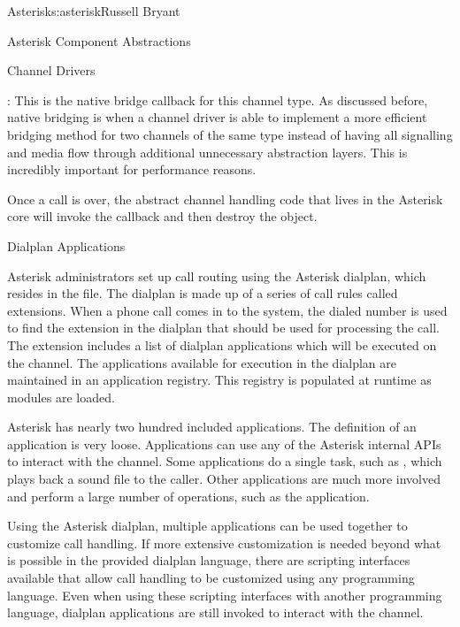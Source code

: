 \begin{aosachapter}{Asterisk}{s:asterisk}{Russell Bryant}
\begin{aosasect1}{Asterisk Component Abstractions}
\begin{aosasect2}{Channel Drivers}
\begin{aosaitemize}
\item {}: This is the native bridge callback
for this channel type. As discussed before, native bridging is when
a channel driver is able to implement a more efficient bridging
method for two channels of the same type instead of having all
signalling and media flow through additional unnecessary abstraction
layers. This is incredibly important for performance reasons.

\end{aosaitemize}

\noindent
Once a call is over, the abstract channel handling code that lives in
the Asterisk core will invoke the 
callback and then destroy the  object.

\end{aosasect2}

\begin{aosasect2}{Dialplan Applications}

Asterisk administrators set up call routing using the Asterisk
dialplan, which resides in the 
file. The dialplan is made up of a series of call rules called
extensions. When a phone call comes in to the system, the dialed
number is used to find the extension in the dialplan that should be
used for processing the call.  The extension includes a list of
dialplan applications which will be executed on the channel. The
applications available for execution in the dialplan are maintained in
an application registry. This registry is populated at runtime as
modules are loaded.

Asterisk has nearly two hundred included applications. The definition
of an application is very loose. Applications can use any of the
Asterisk internal APIs to interact with the channel. Some applications
do a single task, such as , which plays back a sound
file to the caller. Other applications are much more involved and
perform a large number of operations, such as the 
application.

Using the Asterisk dialplan, multiple applications can be used
together to customize call handling. If more extensive customization
is needed beyond what is possible in the provided dialplan language,
there are scripting interfaces available that allow call handling to
be customized using any programming language. Even when using these
scripting interfaces with another programming language, dialplan
applications are still invoked to interact with the channel.


\end{aosasect2}
\end{aosasect1}
\end{aosachapter}
